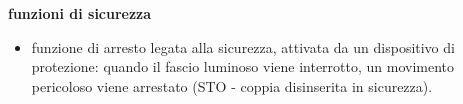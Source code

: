 \begin{center}
    \begin{minipage}{\textwidth}
        \centering
        \captionsetup{hypcap=false}
        \resizebox{\textwidth}{!}{}
        \label{fig:08-17}
    \end{minipage}
\end{center}

\textbf{funzioni di sicurezza}
\begin{itemize}
    \item funzione di arresto legata alla sicurezza, attivata da un dispositivo di protezione: quando il fascio luminoso viene interrotto, un movimento pericoloso viene arrestato (STO - coppia disinserita in sicurezza).
\end{itemize}

